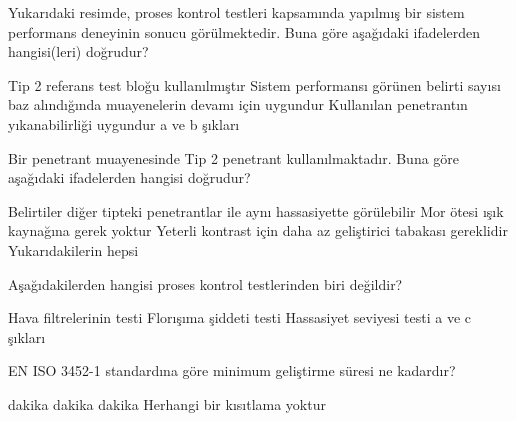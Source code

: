 \begin{question}[subtitle=]
    	\begin{figure}[!htb]
		\centering
	\end{figure}

        Yukarıdaki resimde, proses kontrol testleri kapsamında yapılmış bir sistem performans deneyinin
        sonucu görülmektedir. Buna göre aşağıdaki ifadelerden hangisi(leri) doğrudur?
	\begin{tasks}
          \task Tip 2 referans test bloğu kullanılmıştır \correct
          \task Sistem performansı görünen belirti sayısı baz alındığında muayenelerin devamı
          için uygundur
          \task Kullanılan penetrantın yıkanabilirliği uygundur
          \task a ve b şıkları
	\end{tasks}
\end{question}
\begin{solution}
	\correct
\end{solution}

\begin{question}[subtitle=]
  Bir penetrant muayenesinde Tip 2 penetrant kullanılmaktadır. Buna göre aşağıdaki ifadelerden
  hangisi doğrudur?
	\begin{tasks}
          \task Belirtiler diğer tipteki penetrantlar ile aynı hassasiyette görülebilir
          \task Mor ötesi ışık kaynağına gerek yoktur \correct
          \task Yeterli kontrast için daha az geliştirici tabakası gereklidir
          \task Yukarıdakilerin hepsi 
	\end{tasks}
\end{question}
\begin{solution}
	\correct
\end{solution}

\begin{question}[subtitle=]
  Aşağıdakilerden hangisi proses kontrol testlerinden biri değildir?
	\begin{tasks}
          \task Hava filtrelerinin testi
          \task Florışıma şiddeti testi
          \task Hassasiyet seviyesi testi \correct
          \task a ve c şıkları
	\end{tasks}
\end{question}
\begin{solution}
	\correct
\end{solution}

\begin{question}[subtitle= EN ISO 3452-1]
	EN ISO 3452-1 standardına göre minimum geliştirme süresi ne kadardır?
	\begin{tasks}
		 dakika 
		 dakika 
		 dakika \correct
		\task Herhangi bir kısıtlama yoktur 
	\end{tasks}
\end{question}
\begin{solution}
	\correct
\end{solution}

